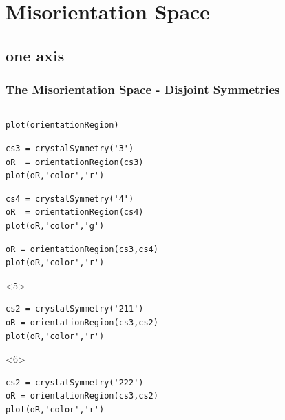 \documentclass[compress]{beamer}
\begin{document}
\section{Misorientation Space}

\subsection*{one axis}

\begin{frame}[fragile]
  \frametitle{The Misorientation Space - Disjoint Symmetries}

  \begin{columns}
    \begin{column}{0.6\textwidth}
      \begin{lstlisting}[style=input]
plot(orientationRegion)
      \end{lstlisting}

      \pause
      \begin{lstlisting}[style=input]
cs3 = crystalSymmetry('3')
oR  = orientationRegion(cs3)
plot(oR,'color','r')
\end{lstlisting}

      \pause
      \begin{lstlisting}[style=input]
cs4 = crystalSymmetry('4')
oR  = orientationRegion(cs4)
plot(oR,'color','g')
      \end{lstlisting}

      \pause
      \begin{lstlisting}[style=input]
oR = orientationRegion(cs3,cs4)
plot(oR,'color','r')
      \end{lstlisting}

      \pause

      \begin{onlyenv}<5>
        \begin{lstlisting}[style=input]
cs2 = crystalSymmetry('211')
oR = orientationRegion(cs3,cs2)
plot(oR,'color','r')
        \end{lstlisting}
      \end{onlyenv}

      \begin{onlyenv}<6>
        \begin{lstlisting}[style=input]
cs2 = crystalSymmetry('222')
oR = orientationRegion(cs3,cs2)
plot(oR,'color','r')
        \end{lstlisting}
      \end{onlyenv}


\end{column}
\end{columns}
\end{frame}
\end{document}
